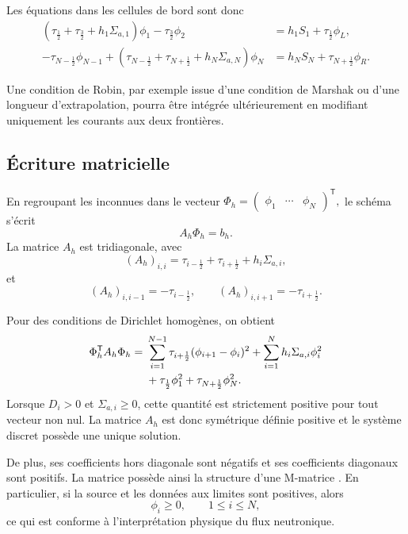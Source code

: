 \documentclass{article}
\begin{document}
Les équations dans les cellules de bord sont donc
\begin{align}
    \left(
        \tau_{\frac12}
        +\tau_{\frac32}
        +h_1\Sigma_{a,1}
    \right)\phi_1
    -\tau_{\frac32}\phi_2
    &=
    h_1S_1+\tau_{\frac12}\phi_L,
    \label{eq:schema-diffusion-bord-gauche}
    \\
    -\tau_{N-\frac12}\phi_{N-1}
    +
    \left(
        \tau_{N-\frac12}
        +\tau_{N+\frac12}
        +h_N\Sigma_{a,N}
    \right)\phi_N
    &=
    h_NS_N+\tau_{N+\frac12}\phi_R.
    \label{eq:schema-diffusion-bord-droit}
\end{align}

Une condition de Robin, par exemple issue d'une condition de Marshak ou d'une longueur d'extrapolation, pourra être intégrée ultérieurement en modifiant uniquement les courants aux deux frontières.

\subsection {Écriture matricielle}

En regroupant les inconnues dans le vecteur  $
    \Phi_h=
    \begin{pmatrix}
        \phi_1&\cdots&\phi_N
    \end{pmatrix}^{\mathsf T},
$
le schéma s'écrit
\begin{equation}
    A_h\Phi_h=b_h.
    \label{eq:systeme-diffusion}
\end{equation}
La matrice $A_h$ est tridiagonale, avec
\[
    (A_h)_{i,i} = \tau_{i-\frac12} +\tau_{i+\frac12} +h_i\Sigma_{a,i},
\]
et
\[
    (A_h)_{i,i-1}=-\tau_{i-\frac12}, \qquad  (A_h)_{i,i+1}=-\tau_{i+\frac12}.
\]

Pour des conditions de Dirichlet homogènes, on obtient
\begin{align}
    \Phi_h^{\mathsf T}A_h\Phi_h
    ={}& \sum_{i=1}^{N-1} \tau_{i+\frac12} (\phi_{i+1}-\phi_i)^2
    + \sum_{i=1}^{N} h_i\Sigma_{a,i}\phi_i^2 \notag\\
    &+ \tau_{\frac12}\phi_1^2 + \tau_{N+\frac12}\phi_N^2.
    \label{eq:energie-discrete-diffusion}
\end{align}
Lorsque $D_i>0$ et $\Sigma_{a,i}\geq0$, cette quantité est strictement
positive pour tout vecteur non nul. La matrice $A_h$ est donc symétrique
définie positive et le système discret possède une unique solution.

De plus, ses coefficients hors diagonale sont négatifs et ses
coefficients diagonaux sont positifs. La matrice possède ainsi la
structure d'une M-matrice \cite[chap.~6, section~6.2]{Allaire2018}. En particulier, si la source et les données
aux limites sont positives, alors
\[
    \phi_i\geq0,
    \qquad 1\leq i\leq N,
\]
ce qui est conforme à l'interprétation physique du flux neutronique.
\end{document}
